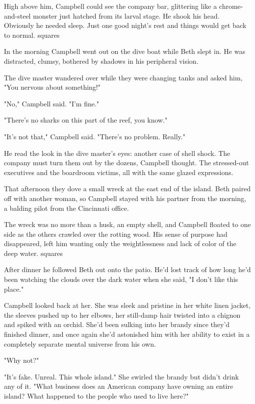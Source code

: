 High above him, Campbell could see the company bar, glittering like a chrome-and-steel monster just hatched from its larval stage. He shook his head. Obviously he needed sleep. Just one good night's rest and things would get back to normal.
squares

In the morning Campbell went out on the dive boat while Beth slept in. He was distracted, clumsy, bothered by shadows in his peripheral vision.

The dive master wandered over while they were changing tanks and asked him, "You nervous about something!"

"No," Campbell said. "I'm fine."

"There's no sharks on this part of the reef, you know."

"It's not that," Campbell said. "There's no problem. Really."

He read the look in the dive master's eyes: another case of shell shock. The company must turn them out by the dozens, Campbell thought. The stressed-out executives and the boardroom victims, all with the same glazed expressions.

That afternoon they dove a small wreck at the east end of the island. Beth paired off with another woman, so Campbell stayed with his partner from the morning, a balding pilot from the Cincinnati office.

The wreck was no more than a husk, an empty shell, and Campbell floated to one side as the others crawled over the rotting wood. His sense of purpose had disappeared, left him wanting only the weightlessness and lack of color of the deep water.
squares

After dinner he followed Beth out onto the patio. He'd lost track of how long he'd been watching the clouds over the dark water when she said, "I don't like this place."

Campbell looked back at her. She was sleek and pristine in her white linen jacket, the sleeves pushed up to her elbows, her still-damp hair twisted into a chignon and spiked with an orchid. She'd been sulking into her brandy since they'd finished dinner, and once again she'd astonished him with her ability to exist in a completely separate mental universe from his own.

"Why not?"

"It's fake. Unreal. This whole island." She swirled the brandy but didn't drink any of it. "What business does an American company have owning an entire island? What happened to the people who used to live here?"

